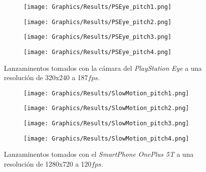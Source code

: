 \begin{figure}[!h]
    \centering
    \begin{subfigure}[b]{0.48\linewidth}
        \texttt{[image: Graphics/Results/PSEye\_pitch1.png]}
    \end{subfigure}
    \begin{subfigure}[b]{0.48\linewidth}
        \texttt{[image: Graphics/Results/PSEye\_pitch2.png]}
    \end{subfigure}
    \begin{subfigure}[b]{0.48\linewidth}
        \texttt{[image: Graphics/Results/PSEye\_pitch3.png]}
    \end{subfigure}
    \begin{subfigure}[b]{0.48\linewidth}
        \texttt{[image: Graphics/Results/PSEye\_pitch4.png]}
    \end{subfigure}
	\caption{Lanzaminentos tomados con la cámara del \textit{PlayStation Eye} a una resolución de 320x240 a 187$fps$.}
	\label{fig:PitchesPSEye}
\end{figure}

\begin{figure}[!h]
    \centering
    \begin{subfigure}[b]{0.48\linewidth}
        \texttt{[image: Graphics/Results/SlowMotion\_pitch1.png]}
    \end{subfigure}
    \begin{subfigure}[b]{0.48\linewidth}
        \texttt{[image: Graphics/Results/SlowMotion\_pitch2.png]}
    \end{subfigure}
    \begin{subfigure}[b]{0.48\linewidth}
        \texttt{[image: Graphics/Results/SlowMotion\_pitch3.png]}
    \end{subfigure}
    \begin{subfigure}[b]{0.48\linewidth}
        \texttt{[image: Graphics/Results/SlowMotion\_pitch4.png]}
    \end{subfigure}
	\caption{Lanzaminentos tomados con el \textit{SmartPhone OnePlus 5T} a una resolución de 1280x720 a 120$fps$.}
	\label{fig:PitchesSlowMotion}
\end{figure}

